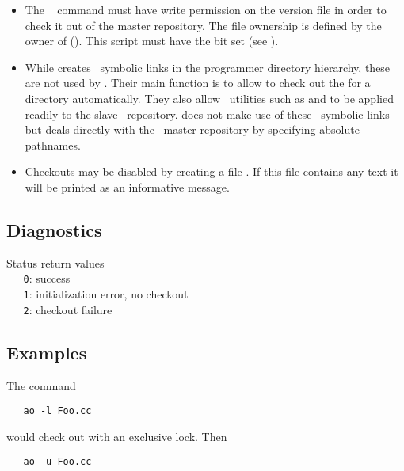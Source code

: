 \begin{itemize}
\item
   The \rcs\  command must have write permission on the version
   file in order to check it out of the master repository.  The file ownership
   is defined by the owner of  ().
   This script must have the  bit set (see ).

\item
   While  creates \rcs\ symbolic links in the programmer
   directory hierarchy, these are not used by .  Their main function
   is to allow  to check out the  for a directory
   automatically.  They also allow \rcs\ utilities such as 
   and  to be applied readily to the slave \rcs\ repository.
    does not make use of these \rcs\ symbolic links but deals directly
   with the \aipspp\ master repository by specifying absolute pathnames.

\item
   Checkouts may be disabled by creating a file .
   If this file contains any text it will be printed as an informative
   message.
\end{itemize}

\subsection*{Diagnostics}

Status return values
\\ \verb+   0+: success
\\ \verb+   1+: initialization error, no checkout
\\ \verb+   2+: checkout failure

\subsection*{Examples}

The command

\begin{verbatim}
   ao -l Foo.cc
\end{verbatim}

\noindent
would check out  with an exclusive lock.  Then

\begin{verbatim}
   ao -u Foo.cc
\end{verbatim}

